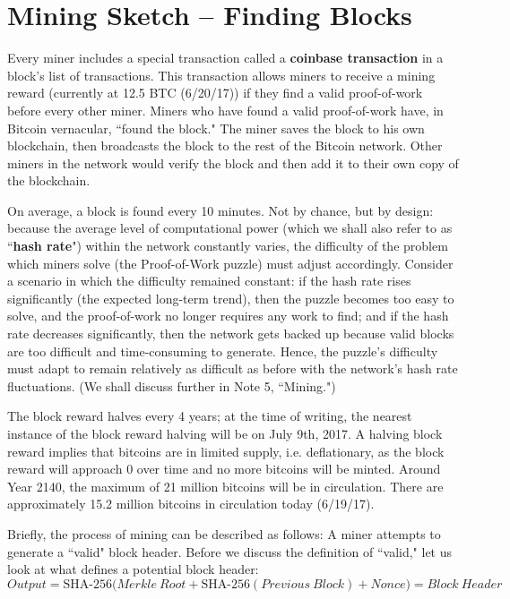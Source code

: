 \documentclass[11pt]{article}
\begin{document}
    \section*{Mining Sketch -- Finding Blocks}
    
    Every miner includes a special transaction called a \textbf{coinbase transaction} in a block's list of transactions. This transaction allows miners to receive a mining reward \big(currently at 12.5 BTC (6/20/17)\big) if they find a valid proof-of-work before every other miner. Miners who have found a valid proof-of-work have, in Bitcoin vernacular, ``found the block." The miner saves the block to his own blockchain, then broadcasts the block to the rest of the Bitcoin network. Other miners in the network would verify the block and then add it to their own copy of the blockchain.
    
    On average, a block is found every 10 minutes. Not by chance, but by design: because the average level of computational power (which we shall also refer to as ``\textbf{hash rate}") within the network constantly varies, the difficulty of the problem which miners solve (the Proof-of-Work puzzle) must adjust accordingly. Consider a scenario in which the difficulty remained constant: if the hash rate rises significantly (the expected long-term trend), then the puzzle becomes too easy to solve, and the proof-of-work no longer requires any work to find; and if the hash rate decreases significantly, then the network gets backed up because valid blocks are too difficult and time-consuming to generate. Hence, the puzzle's difficulty must adapt to remain relatively as difficult as before with the network's hash rate fluctuations. (We shall discuss further in Note 5, ``Mining.") 
    
    The block reward halves every 4 years; at the time of writing, the nearest instance of the block reward halving will be on July 9th, 2017. A halving block reward implies that bitcoins are in limited supply, i.e. deflationary, as the block reward will approach 0 over time and no more bitcoins will be minted. Around Year 2140, the maximum of 21 million bitcoins will be in circulation. There are approximately 15.2 million bitcoins in circulation today (6/19/17).
    
    Briefly, the process of mining can be described as follows: A miner attempts to generate a ``valid" block header. Before we discuss the definition of ``valid," let us look at what defines a potential block header:
    $$\mathit{Output} = \text{SHA-256}\big(\mathit{Merkle~Root} + \text{SHA-256}(\mathit{Previous~Block}) + \mathit{Nonce}\big) = \mathit{Block~Header}$$
    
\end{document}
